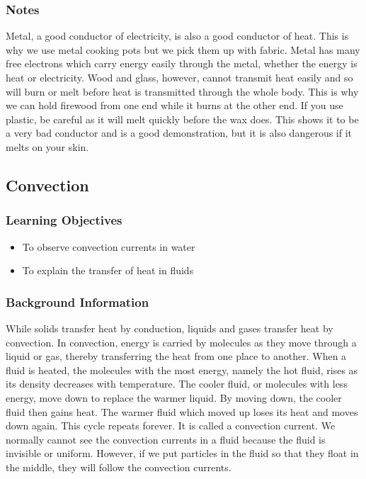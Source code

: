 \subsubsection*{Notes}
Metal, a good conductor of electricity, is also a good conductor of heat. This is why we use metal cooking pots but we pick them up with fabric. Metal has many free electrons which carry energy easily through the metal, whether the energy is heat or electricity. Wood and glass, however, cannot transmit heat easily and so will burn or melt before heat is transmitted through the whole body. This is why we can hold firewood from one end while it burns at the other end.  
If you use plastic, be careful as it will melt quickly before the wax does. This shows it to be a very bad conductor and is a good demonstration, but it is also dangerous if it melts on your skin.  

\subsection{Convection}

\subsubsection*{Learning Objectives}
\begin{itemize}
\item{To observe convection currents in water}
\item{To explain the transfer of heat in fluids}
\end{itemize}

\subsubsection*{Background Information}
While solids transfer heat by conduction, liquids and gases transfer heat by convection.  In convection, energy is carried by molecules as they move through a liquid or gas, thereby transferring the heat from one place to another.
When a fluid is heated, the molecules with the most energy, namely the hot fluid, rises as its density decreases with temperature.  The cooler fluid, or molecules with less energy, move down to replace the warmer liquid.  By moving down, the cooler fluid then gains heat.  The warmer fluid which moved up loses its heat and moves down again.  This cycle repeats forever.  It is called a convection current.
We normally cannot see the convection currents in a fluid because the fluid is invisible or uniform.  However, if we put particles in the fluid so that they float in the middle, they will follow the convection currents.

